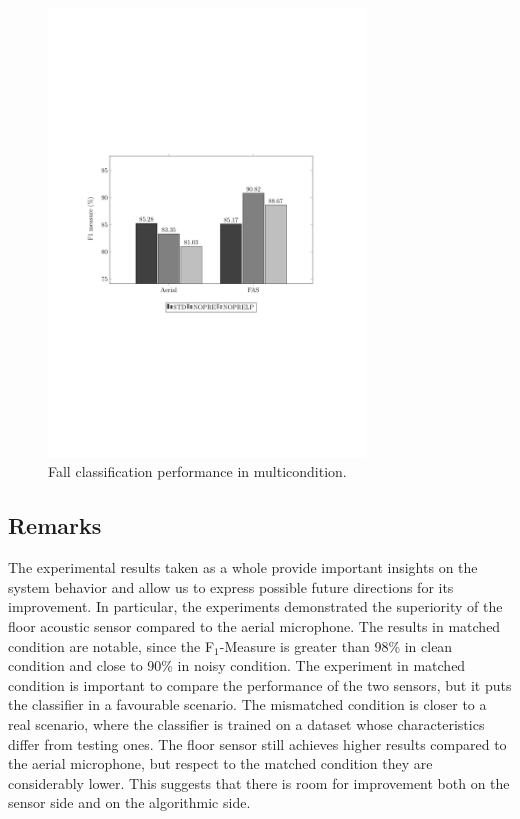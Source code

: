 \begin{figure}[t]
	\centering
	\includegraphics[width=0.75\textwidth]{img/pgfsources/16_multicondition/16_multicondition}
	\caption{Fall classification performance in multicondition.} \label{fig:results_multi}
\end{figure}

\subsection{Remarks}
The experimental results taken as a whole provide important insights on the system behavior and allow us to express possible future directions for its improvement. In particular, the experiments demonstrated the superiority of the floor acoustic sensor compared to the aerial microphone. The results in matched condition are notable, since the F$_1$-Measure is greater than 98\% in clean condition and close to 90\% in noisy condition. The experiment in matched condition is important to compare the performance of the two sensors, but it puts the classifier in a favourable scenario. The mismatched condition is closer to a real scenario, where the classifier is trained on a dataset whose characteristics differ from testing ones. The floor sensor still achieves higher results compared to the aerial microphone, but respect to the matched condition they are considerably lower. This suggests that there is room for improvement both on the sensor side and on the algorithmic side.

